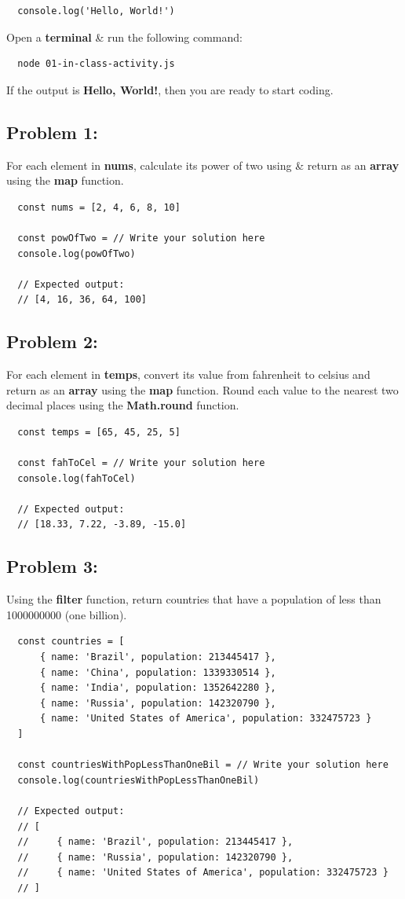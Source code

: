 \documentclass{article}
\begin{document}
\begin{verbatim}
  console.log('Hello, World!')
\end{verbatim}

Open a \textbf{terminal} \& run the following command:

\begin{verbatim}
  node 01-in-class-activity.js
\end{verbatim}

If the output is \textbf{Hello, World!}, then you are ready to start coding.

\subsection*{Problem 1:}
For each element in \textbf{nums}, calculate its power of two using \& return as an \textbf{array} using the \textbf{map} function.

\begin{verbatim}
  const nums = [2, 4, 6, 8, 10]

  const powOfTwo = // Write your solution here
  console.log(powOfTwo)

  // Expected output:
  // [4, 16, 36, 64, 100]
\end{verbatim}

\subsection*{Problem 2:}
For each element in \textbf{temps}, convert its value from fahrenheit to celsius and return as an \textbf{array} using the \textbf{map} function. Round each value to the nearest two decimal places using the \textbf{Math.round} function.

\begin{verbatim}
  const temps = [65, 45, 25, 5]

  const fahToCel = // Write your solution here
  console.log(fahToCel)

  // Expected output:
  // [18.33, 7.22, -3.89, -15.0]
\end{verbatim}

\subsection*{Problem 3:}
Using the \textbf{filter} function, return countries that have a population of less than 1000000000 (one billion).

\begin{verbatim}
  const countries = [
      { name: 'Brazil', population: 213445417 },
      { name: 'China', population: 1339330514 },
      { name: 'India', population: 1352642280 },
      { name: 'Russia', population: 142320790 },
      { name: 'United States of America', population: 332475723 }
  ]

  const countriesWithPopLessThanOneBil = // Write your solution here
  console.log(countriesWithPopLessThanOneBil)

  // Expected output:
  // [
  //     { name: 'Brazil', population: 213445417 }, 
  //     { name: 'Russia', population: 142320790 }, 
  //     { name: 'United States of America', population: 332475723 }
  // ]
\end{verbatim}
\end{document}
